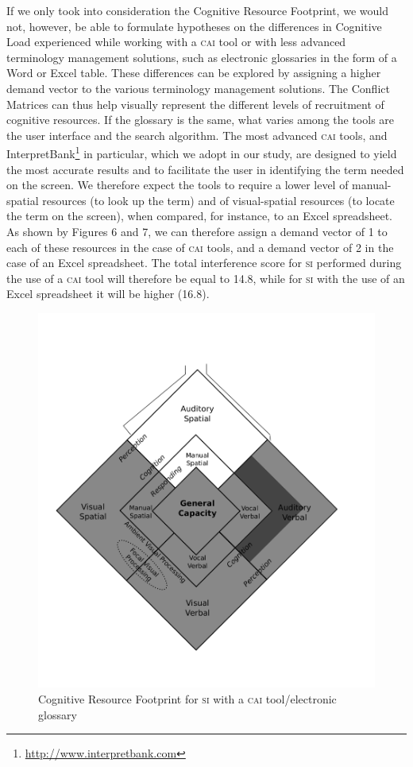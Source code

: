 \documentclass[output=paper]{langsci/langscibook}
\begin{document}
If we only took into consideration the Cognitive Resource Footprint, we would not, however, be able to formulate hypotheses on the differences in Cognitive Load experienced while working with a \textsc{cai} tool or with less advanced terminology management solutions, such as electronic glossaries in the form of a Word or Excel table. These differences can be explored by assigning a higher demand vector to the various terminology management solutions. The Conflict Matrices can thus help visually represent the different levels of recruitment of cognitive resources. If the glossary is the same, what varies among the tools are the user interface and the search algorithm. The most advanced \textsc{cai} tools, and InterpretBank\footnote{\url{http://www.interpretbank.com}} in particular, which we adopt in our study, are designed to yield the most accurate results and to facilitate the user in identifying the term needed on the screen. We therefore expect the tools to require a lower level of manual-spatial resources (to look up the term) and of visual-spatial resources (to locate the term on the screen), when compared, for instance, to an Excel spreadsheet. As shown by Figures 6 and 7, we can therefore assign a demand vector of 1 to each of these resources in the case of \textsc{cai} tools, and a demand vector of 2 in the case of an Excel spreadsheet. The total interference score for \textsc{si} performed during the use of a \textsc{cai} tool will therefore be equal to 14.8, while for \textsc{si} with the use of an Excel spreadsheet it will be higher (16.8).

\begin{figure}
	\includegraphics[width=.7\textwidth]{figures/fig2-5.pdf}
\caption{\label{fig:prandi:5}Cognitive Resource Footprint for \textsc{si} with a \textsc{cai} tool/electronic glossary}
\end{figure}
\end{document}

